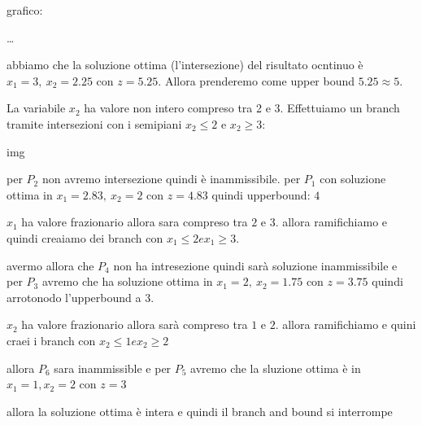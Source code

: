 grafico:

\dots

abbiamo che la soluzione ottima (l'intersezione) del risultato ocntinuo è $x_1 = 3,\ x_2 = 2.25$ con $z = 5.25$. Allora prenderemo come upper bound $5.25 \approx 5$.

La variabile $x_2$ ha valore non intero compreso tra 2 e 3. Effettuiamo un branch tramite intersezioni con i semipiani $x_2 \leq 2$ e $x_2 \geq 3$:

img

per $P_2$ non avremo intersezione quindi è inammissibile. per $P_1$ con soluzione ottima in $x_1 = 2.83,\ x_2 = 2$ con $z = 4.83$ quindi upperbound: $4$

$x_1$ ha valore frazionario allora sara compreso tra $2$ e $3$. allora ramifichiamo e quindi creaiamo dei branch con $x_1 \leq 2 e x_1 \geq 3$.

avermo allora che $P_4$ non ha intresezione quindi sarà soluzione inammissibile e per $P_3$ avremo che ha soluzione ottima in $x_1 = 2,\ x_2 = 1.75$ con $z = 3.75$ quindi arrotonodo l'upperbound a $3$.

$x_2$ ha valore frazionario allora sarà compreso tra $1$ e $2$. allora ramifichiamo e quini craei i branch con $x_2 \leq 1 e x_2 \geq 2$

allora $P_6$ sara inammissible e per $P_5$ avremo che la sluzione ottima è in $x_1 = 1, x_2 = 2$ con $z = 3$

allora la soluzione ottima è intera e quindi il branch and bound si interrompe